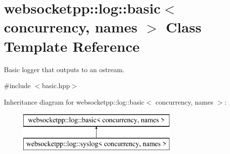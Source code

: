 \hypertarget{classwebsocketpp_1_1log_1_1basic}{}\section{websocketpp\+:\+:log\+:\+:basic$<$ concurrency, names $>$ Class Template Reference}
\label{classwebsocketpp_1_1log_1_1basic}


Basic logger that outputs to an ostream.  




{\ttfamily \#include $<$basic.\+hpp$>$}

Inheritance diagram for websocketpp\+:\+:log\+:\+:basic$<$ concurrency, names $>$\+:\begin{figure}[H]
\begin{center}
\leavevmode
\includegraphics[height=2.000000cm]{classwebsocketpp_1_1log_1_1basic}
\end{center}
\end{figure}
